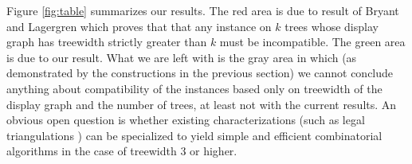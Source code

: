 Figure \ref{fig:table} summarizes our results. The red area is due to result of Bryant and Lagergren which proves that that any instance on $k$ trees whose display graph has treewidth strictly greater than $k$ must be incompatible. The green area is due to our result. What we are left with is the gray area in which (as demonstrated by the constructions in the previous section) we cannot conclude anything about compatibility of the instances based only on treewidth of the display graph and the number of trees, at least not with the current results. An obvious open question is whether existing characterizations (such as legal triangulations \cite{vakati2011graph}) can be specialized to yield simple and efficient combinatorial algorithms in the case of treewidth 3 or higher.


